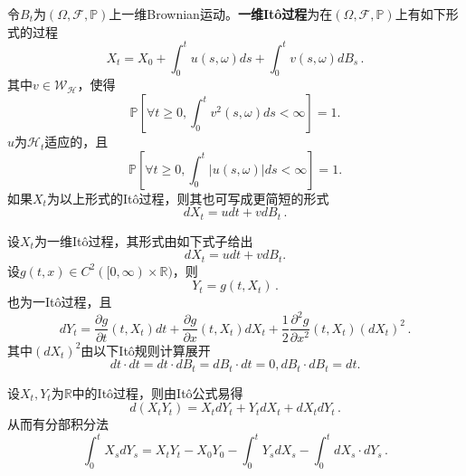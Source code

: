 \documentclass[oneside]{sysuthesis}
\begin{document}
\begin{definition}\label{def:Ito_process}
	令$B_t$为$(\Omega,\mathcal{F},\mathbb{P})$上一维Brownian运动。\textbf{一维It\^o过程}为在$(\Omega,\mathcal{F},\mathbb{P})$上有如下形式的过程
	\[
	X_t=X_0+\int_{0}^{t}u(s,\omega)ds+\int_{0}^{t}v(s,\omega)dB_s\,.
	\]
	其中$v\in\mathcal{W}_{\mathcal{H}}$，使得
	\[
	\mathbb{P}\left[\forall t\ge 0,\int_{0}^{t}v^2(s,\omega)ds<\infty\right]=1.
	\]
	$u$为$\mathcal{H}_t$适应的，且
	\[
	\mathbb{P}\left[\forall t\ge 0,\int_{0}^{t}\left\vert u(s,\omega)\right\vert ds<\infty\right]=1.
	\]
	如果$X_t$为以上形式的It\^o过程，则其也可写成更简短的形式
	\[
	dX_t=udt+vdB_t\,.
	\]
\end{definition}

\begin{theorem}\label{theo:Ito_fomula}
	设$X_t$为一维It\^o过程，其形式由如下式子给出
	\[
	dX_t=udt+vdB_t.
	\]
	设$g(t,x)\in C^2([0,\infty)\times\mathbb{R})$，则
	\[
	Y_t=g(t,X_t)\,.
	\]
	也为一It\^o过程，且
	\[
	dY_t=\frac{\partial g}{\partial t}(t,X_t)dt+\frac{\partial g}{\partial x}(t,X_t)dX_t+\frac{1}{2}\frac{\partial^2 g}{\partial x^2}(t,X_t)(dX_t)^2\,.
	\]
	其中$(dX_t)^2$由以下It\^o规则计算展开
	\[
	dt\cdot dt=dt\cdot dB_t=dB_t\cdot dt=0,dB_t\cdot dB_t=dt.
	\]
\end{theorem}

\begin{theorem}[It\^o积分分部积分法]\label{theo:Ito_part_int}
	设$X_t,Y_t$为$\mathbb{R}$中的It\^o过程，则由It\^o公式易得
	\[
	d(X_tY_t)=X_tdY_t+Y_tdX_t+dX_tdY_t\,.
	\]
	从而有分部积分法
	\[
	\int_{0}^{t}X_sdY_s=X_tY_t-X_0Y_0-\int_{0}^{t}Y_sdX_s-\int_{0}^{t}dX_s\cdot dY_s\,.
	\]
\end{theorem}
\end{document}
